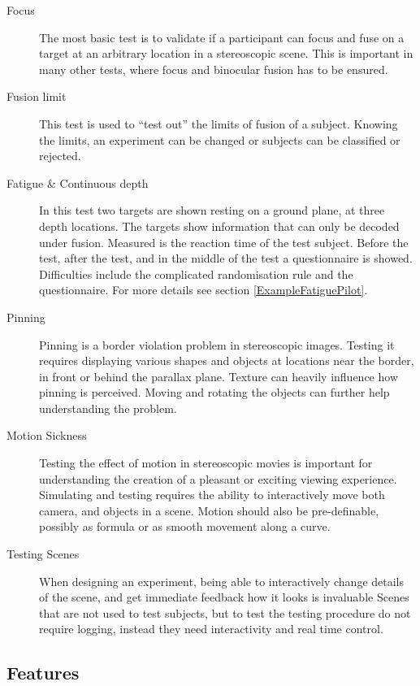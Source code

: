 \begin{description}
\item[Focus]
The most basic test is to validate if a participant can focus and fuse on a target at an arbitrary location in a stereoscopic scene.
This is important in many other tests, where focus and binocular fusion has to be ensured.

\item[Fusion limit]
This test is used to ``test out'' the limits of fusion of a subject.
Knowing the limits, an experiment can be changed or subjects can be classified or rejected.

\item[Fatigue \& Continuous depth]
In this test two targets are shown resting on a ground plane, at three depth locations.
The targets show information that can only be decoded under fusion.
Measured is the reaction time of the test subject.
Before the test, after the test, and in the middle of the test a questionnaire is showed.
Difficulties include the complicated randomisation rule and the questionnaire.
For more details see section \ref{ExampleFatiguePilot}.

\item[Pinning]
Pinning is a border violation problem in stereoscopic images.
Testing it requires displaying various shapes and objects at locations near the border, in front or behind the parallax plane.
Texture can heavily influence how pinning is perceived.
Moving and rotating the objects can further help understanding the problem.

\item[Motion Sickness]
Testing the effect of motion in stereoscopic movies is important for understanding the creation of a pleasant or exciting viewing experience.
Simulating and testing requires the ability to interactively move both camera, and objects in a scene.
Motion should also be pre-definable, possibly as formula or as smooth movement along a curve.

\item[Testing Scenes]
When designing an experiment, being able to interactively change details of the scene, and get immediate feedback how it looks is invaluable
Scenes that are not used to test subjects, but to test the testing procedure do not require logging, instead they need interactivity and real time control.
\end{description}


\subsection{Features}
